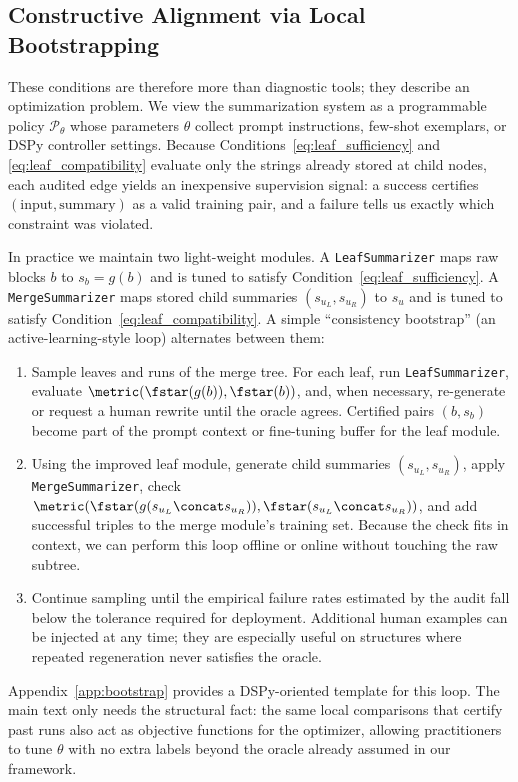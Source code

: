\subsection{Constructive Alignment via Local Bootstrapping}\label{sec:bootstrap-main}

These conditions are therefore more than diagnostic tools; they describe an optimization problem. We view the summarization system as a programmable policy $\mathcal{P}_\theta$ whose parameters $\theta$ collect prompt instructions, few-shot exemplars, or DSPy controller settings. Because Conditions~\eqref{eq:leaf_sufficiency} and \eqref{eq:leaf_compatibility} evaluate only the strings already stored at child nodes, each audited edge yields an inexpensive supervision signal: a success certifies $(\text{input},\text{summary})$ as a valid training pair, and a failure tells us exactly which constraint was violated.

In practice we maintain two light-weight modules. A \texttt{LeafSummarizer} maps raw blocks $b$ to $s_b=g(b)$ and is tuned to satisfy Condition~\eqref{eq:leaf_sufficiency}. A \texttt{MergeSummarizer} maps stored child summaries $(s_{u_L},s_{u_R})$ to $s_u$ and is tuned to satisfy Condition~\eqref{eq:leaf_compatibility}. A simple ``consistency bootstrap'' (an active-learning-style loop) alternates between them:
\begin{enumerate}[label=\roman*.]
    \item Sample leaves and runs of the merge tree. For each leaf, run \texttt{LeafSummarizer}, evaluate $\metric(\fstar(g(b)),\fstar(b))$, and, when necessary, re-generate or request a human rewrite until the oracle agrees. Certified pairs $(b,s_b)$ become part of the prompt context or fine-tuning buffer for the leaf module.
    \item Using the improved leaf module, generate child summaries $(s_{u_L},s_{u_R})$, apply \texttt{MergeSummarizer}, check $\metric(\fstar(g(s_{u_L}\concat s_{u_R})),\fstar(s_{u_L}\concat s_{u_R}))$, and add successful triples to the merge module's training set. Because the check fits in context, we can perform this loop offline or online without touching the raw subtree.
    \item Continue sampling until the empirical failure rates estimated by the audit fall below the tolerance required for deployment. Additional human examples can be injected at any time; they are especially useful on structures where repeated regeneration never satisfies the oracle.
\end{enumerate}
Appendix~\ref{app:bootstrap} provides a DSPy-oriented template for this loop. The main text only needs the structural fact: the same local comparisons that certify past runs also act as objective functions for the optimizer, allowing practitioners to tune $\theta$ with no extra labels beyond the oracle already assumed in our framework.
